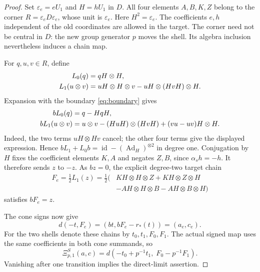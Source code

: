 \documentclass[11pt,letterpaper]{article}
\theoremstyle{definition}
\theoremstyle{remark}
\begin{document}
\begin{proof}
Set $\varepsilon_e=eU_1$ and $H=hU_1$ in $D$.
All four elements $A,B,K,Z$ belong to the corner
$R=\varepsilon_eD\varepsilon_e$, whose unit is $\varepsilon_e$.
Here $H^2=\varepsilon_e$. The coefficients $e,h$ independent
of the old coordinates are allowed in the target. The corner
need not be central in $D$: the new group generator $p$ moves
the shell. Its algebra inclusion nevertheless induces a chain map.

For $q,u,v\in R$, define
\begin{align}
 L_0(q)&=qH\otimes H,\notag\\
 L_1(u\otimes v)&=uH\otimes H\otimes v
                 -uH\otimes(HvH)\otimes H.
 \label{eq:inner-filling}
\end{align}
Expansion with the boundary \eqref{eq:boundary} gives
\begin{align}
 bL_0(q)&=q-HqH,\notag\\
 bL_1(u\otimes v)
   &=u\otimes v-(HuH)\otimes(HvH)
                       +(vu-uv)H\otimes H.
 \label{eq:inner-homotopy}
\end{align}
Indeed, the two terms $uH\otimes Hv$ cancel; the other four
terms give the displayed expression. Hence
$bL_1+L_0b=\operatorname{id}-(\operatorname{Ad}_H)^{\otimes2}$
in degree one. Conjugation by $H$ fixes the coefficient
elements $K,A$ and negates $Z,B$, since $\alpha_s h=-h$.
It therefore sends $z$ to $-z$. As $bz=0$, the explicit
degree-two target chain
\begin{equation}
 \begin{split}
 F_e=\tfrac12L_1(z)=\tfrac12\bigl(
 &KH\otimes H\otimes Z+KH\otimes Z\otimes H\\
 &-AH\otimes H\otimes B-AH\otimes B\otimes H\bigr)
 \end{split}
 \label{eq:target-shell-filling}
\end{equation}
satisfies $bF_e=z$.

The cone signs now give
\begin{equation}
 d(-t,F_e)=(bt,bF_e-r_*(t))=(a_e,c_e).
 \label{eq:cone-shell-boundary}
\end{equation}
For the two shells denote these chains by $t_0,t_1,F_0,F_1$.
The actual signed map uses the same coefficients in both
cone summands, so
\begin{equation}
 \Xi_{p,1}^S(a,c)=d(-t_0+p^{-1}t_1,\;F_0-p^{-1}F_1).
 \label{eq:signed-origin-boundary}
\end{equation}
Vanishing after one transition implies the direct-limit assertion.
\end{proof}
\end{document}
